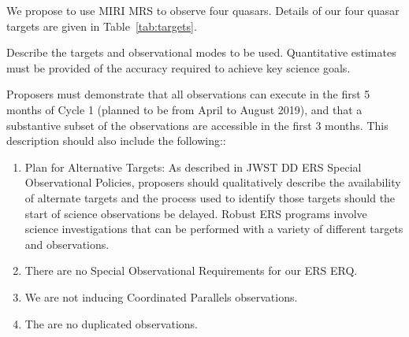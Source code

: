 
We propose to use MIRI MRS to observe four quasars. Details of our 
four quasar targets are given in Table~\ref{tab:targets}. 

Describe the targets and observational modes to be used. Quantitative
estimates must be provided of the accuracy required to achieve key
science goals. 

Proposers must demonstrate that all observations can
execute in the first 5 months of Cycle 1 (planned to be from April to
August 2019), and that a substantive subset of the observations are
accessible in the first 3 months. This description should also include
the following::


\begin{enumerate}[label=\alph*]
    \item{Plan for Alternative Targets: As described in JWST DD ERS
        Special Observational Policies, proposers should qualitatively
        describe the availability of alternate targets and the process used to
        identify those targets should the start of science observations be
        delayed.  Robust ERS programs involve science investigations that can
        be performed with a variety of different targets and observations. }
      
    \item{There are no Special Observational Requirements for our ERS ERQ.} 

    \item{We are not inducing Coordinated Parallels observations.}

    \item{The are no duplicated observations.} 
\end{enumerate}


